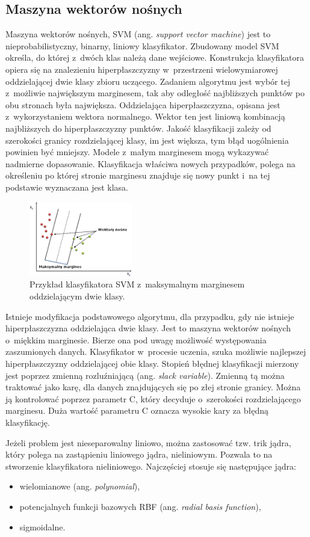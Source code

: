 \subsection{Maszyna wektorów nośnych}
Maszyna wektorów nośnych, SVM (ang. \textit{support vector machine}) jest to nieprobabilistyczny, binarny, liniowy klasyfikator. Zbudowany model SVM określa, do której z~dwóch klas należą dane wejściowe. Konstrukcja klasyfikatora opiera się na znalezieniu hiperpłaszczyzny  w~przestrzeni wielowymiarowej oddzielającej dwie klasy zbioru uczącego. Zadaniem algorytmu jest wybór tej z~możliwie największym marginesem, tak aby odległość najbliższych punktów po obu stronach była największa. Oddzielająca hiperpłaszczyzna, opisana jest z~wykorzystaniem wektora normalnego. Wektor ten jest liniową kombinacją najbliższych do hiperpłaszczyzny punktów. Jakość klasyfikacji zależy od szerokości granicy rozdzielającej klasy, im jest większa, tym błąd uogólnienia powinien być mniejszy. Modele z~małym marginesem mogą wykazywać nadmierne dopasowanie. Klasyfikacja właściwa nowych przypadków, polega na określeniu po której stronie marginesu znajduje się nowy punkt i~na tej podstawie wyznaczana jest klasa. \par
\begin{figure}[H]
	\centering
	\includegraphics[width=0.4\textwidth]{./images/svm.png}
	\caption[Przykład klasyfikatora SVM]{Przykład klasyfikatora SVM z~maksymalnym marginesem oddzielającym dwie klasy.}
	\label{fig:klassvm}
\end{figure}
Istnieje modyfikacja podstawowego algorytmu, dla przypadku, gdy nie istnieje hiperpłaszczyzna oddzielająca dwie klasy. Jest to maszyna wektorów nośnych o~miękkim marginesie. Bierze ona pod uwagę możliwość występowania zaszumionych danych. Klasyfikator w~procesie uczenia, szuka możliwie najlepszej hiperpłaszczyzny oddzielającej obie klasy. Stopień błędnej klasyfikacji mierzony jest poprzez zmienną rozluźniającą (ang. \textit{slack variable}). Zmienną tą można traktować jako karę, dla danych znajdujących się po złej stronie granicy. Można ją kontrolować poprzez parametr C, który decyduje o~szerokości rozdzielającego marginesu. Duża wartość parametru C oznacza wysokie kary za błędną klasyfikację. \par
Jeżeli problem jest nieseparowalny  liniowo, można zastosować tzw. trik jądra, który polega na zastąpieniu liniowego jądra, nieliniowym. Pozwala to na stworzenie klasyfikatora nieliniowego. Najczęściej stosuje się następujące jądra:
\begin{itemize}
	\item wielomianowe (ang. \textit{polynomial}),
	\item potencjalnych funkcji bazowych RBF (ang. \textit{radial basis function}),
	\item sigmoidalne.
\end{itemize}

